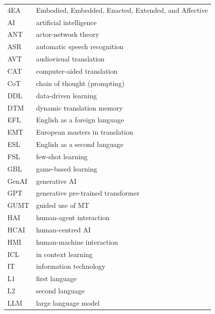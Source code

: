 \begin{tabularx}{.48\textwidth}{lQ}
4EA    &Embodied, Embedded, Enacted, Extended, and Affective\\
AI     &artificial intelligence                                         \\
ANT    &actor-network theory                                            \\
ASR    &automatic speech recognition                                    \\
AVT    &audiovisual translation                                         \\
CAT    &computer-aided translation                                      \\
CoT    &chain of thought (prompting)                                    \\
DDL    &data-driven learning                                            \\
DTM    &dynamic translation memory                                      \\
EFL    &English as a foreign language                                   \\
EMT    &European masters in translation                                 \\
ESL    &English as a second language                                    \\
FSL    &few-shot learning                                               \\
GBL    &game-based learning                                             \\
GenAI  &generative AI                                                   \\
GPT    &generative pre-trained transformer                              \\
GUMT   &guided use of MT                                                \\
HAI    &human-agent interaction                                         \\
HCAI   &human-centred AI                                                \\
HMI    &human-machine interaction                                       \\
ICL    &in context learning                                             \\
IT     &information technology                                          \\
L1     &first language                                                  \\
L2     &second language                                                 \\
LLM    &large language model                                            \\
\end{tabularx}
